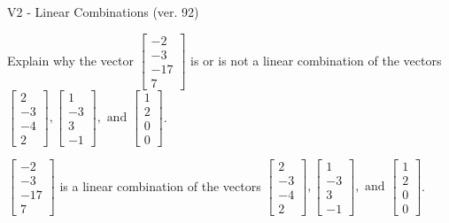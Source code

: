 \begin{exercise}
  \begin{exerciseTitle}V2 - Linear Combinations (ver. 92)\end{exerciseTitle}
  \begin{exerciseStatement}
    Explain why the vector \(\left[\begin{array}{c}
-2 \\
-3 \\
-17 \\
7
\end{array}\right]\)  is or is not a linear 
	combination of the vectors \(\left[\begin{array}{c}
2 \\
-3 \\
-4 \\
2
\end{array}\right] , \left[\begin{array}{c}
1 \\
-3 \\
3 \\
-1
\end{array}\right] , \text{ and } \left[\begin{array}{c}
1 \\
2 \\
0 \\
0
\end{array}\right]\).
	


  \end{exerciseStatement}
  \begin{exerciseAnswer}
   \(\left[\begin{array}{c}
-2 \\
-3 \\
-17 \\
7
\end{array}\right]\) 
  	 is  
	a linear combination of the vectors \(\left[\begin{array}{c}
2 \\
-3 \\
-4 \\
2
\end{array}\right] , \left[\begin{array}{c}
1 \\
-3 \\
3 \\
-1
\end{array}\right] , \text{ and } \left[\begin{array}{c}
1 \\
2 \\
0 \\
0
\end{array}\right]\).

	
  


  \end{exerciseAnswer}
\end{exercise}